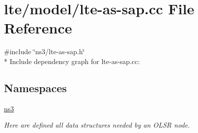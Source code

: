 \hypertarget{lte-as-sap_8cc}{}\section{lte/model/lte-\/as-\/sap.cc File Reference}
\label{lte-as-sap_8cc}
{\ttfamily \#include \char`\"{}ns3/lte-\/as-\/sap.\+h\char`\"{}}\\*
Include dependency graph for lte-\/as-\/sap.cc\+:
\subsection*{Namespaces}
\begin{DoxyCompactItemize}
\item 
 \hyperlink{namespacens3}{ns3}
\begin{DoxyCompactList}\small\item\em Here are defined all data structures needed by an O\+L\+SR node. \end{DoxyCompactList}\end{DoxyCompactItemize}

